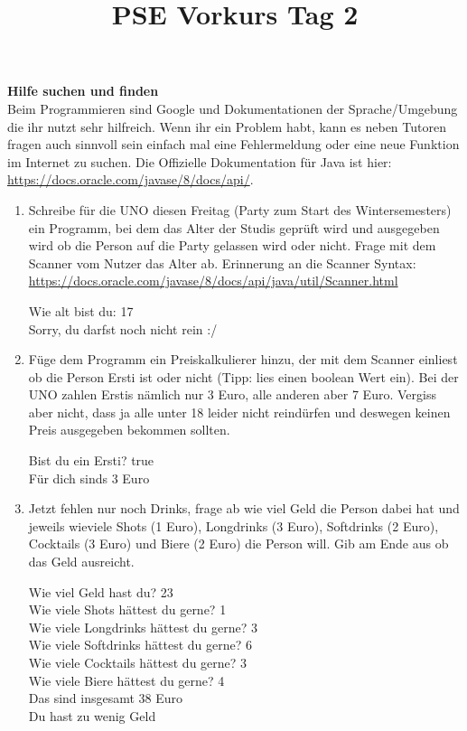 \documentclass{../../sheet}
\title{PSE Vorkurs Tag 2}
\begin{document}
\maketitle

\textbf{Hilfe suchen und finden}\\
Beim Programmieren sind Google und Dokumentationen der Sprache/Umgebung die ihr nutzt sehr hilfreich. Wenn ihr ein Problem habt, kann es neben Tutoren fragen auch sinnvoll sein einfach mal eine Fehlermeldung oder eine neue Funktion im Internet zu suchen. Die Offizielle Dokumentation für Java ist hier: \url{https://docs.oracle.com/javase/8/docs/api/}.


\newpage
{}
\begin{enumerate}
    \item Schreibe für die UNO diesen Freitag (Party zum Start des Wintersemesters) ein Programm, bei dem das Alter der Studis geprüft wird und ausgegeben wird ob die Person auf die Party gelassen wird oder nicht. Frage mit dem Scanner vom Nutzer das Alter ab. Erinnerung an die Scanner Syntax:\\ \url{https://docs.oracle.com/javase/8/docs/api/java/util/Scanner.html}
    \begin{ausgabe}
        Wie alt bist du: 17\\
        Sorry, du darfst noch nicht rein :/
    \end{ausgabe}
    \item Füge dem Programm ein Preiskalkulierer hinzu, der mit dem Scanner einliest ob die Person Ersti ist oder nicht (Tipp: lies einen boolean Wert ein). Bei der UNO zahlen Erstis nämlich nur 3 Euro, alle anderen aber 7 Euro. Vergiss aber nicht, dass ja alle unter 18 leider nicht reindürfen und deswegen keinen Preis ausgegeben bekommen sollten.
    \begin{ausgabe}
        Bist du ein Ersti? true\\
        Für dich sinds 3 Euro
    \end{ausgabe}
    \item Jetzt fehlen nur noch Drinks, frage ab wie viel Geld die Person dabei hat und jeweils wieviele Shots (1 Euro), Longdrinks (3 Euro), Softdrinks (2 Euro), Cocktails (3 Euro) und Biere (2 Euro) die Person will. Gib am Ende aus ob das Geld ausreicht.
    \begin{ausgabe}
        Wie viel Geld hast du? 23\\
        Wie viele Shots hättest du gerne? 1\\
        Wie viele Longdrinks hättest du gerne? 3\\
        Wie viele Softdrinks hättest du gerne? 6\\
        Wie viele Cocktails hättest du gerne? 3\\
        Wie viele Biere hättest du gerne? 4\\
        Das sind insgesamt 38 Euro\\
        Du hast zu wenig Geld
    \end{ausgabe}
\end{enumerate}
\end{document}

